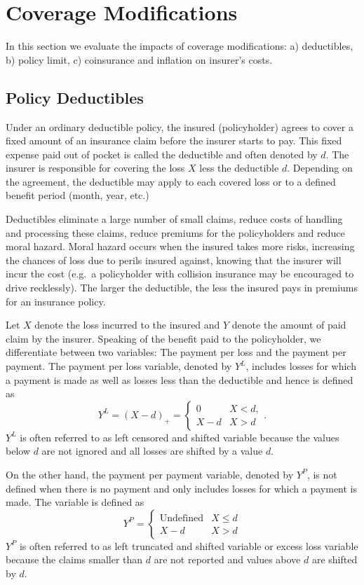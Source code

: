 \documentclass[]{book}
\begin{document}
\section{Coverage Modifications}\label{coverage-modifications}

In this section we evaluate the impacts of coverage modifications: a)
deductibles, b) policy limit, c) coinsurance and inflation on insurer's
costs.

\subsection{Policy Deductibles}\label{PolicyDeduct}

Under an ordinary deductible policy, the insured (policyholder) agrees
to cover a fixed amount of an insurance claim before the insurer starts
to pay. This fixed expense paid out of pocket is called the deductible
and often denoted by \(d\). The insurer is responsible for covering the
loss \(X\) less the deductible \(d\). Depending on the agreement, the
deductible may apply to each covered loss or to a defined benefit period
(month, year, etc.)

Deductibles eliminate a large number of small claims, reduce costs of
handling and processing these claims, reduce premiums for the
policyholders and reduce moral hazard. Moral hazard occurs when the
insured takes more risks, increasing the chances of loss due to perils
insured against, knowing that the insurer will incur the cost (e.g.~a
policyholder with collision insurance may be encouraged to drive
recklessly). The larger the deductible, the less the insured pays in
premiums for an insurance policy.

Let \(X\) denote the loss incurred to the insured and \(Y\) denote the
amount of paid claim by the insurer. Speaking of the benefit paid to the
policyholder, we differentiate between two variables: The payment per
loss and the payment per payment. The payment per loss variable, denoted
by \(Y^{L}\), includes losses for which a payment is made as well as
losses less than the deductible and hence is defined as
\[Y^{L} = \left( X - d \right)_{+} 
= \left\{ \begin{array}{cc}
0 & X < d, \\
X - d & X > d  
\end{array} \right. .\] \(Y^{L}\) is often referred to as left censored
and shifted variable because the values below \(d\) are not ignored and
all losses are shifted by a value \(d\).

On the other hand, the payment per payment variable, denoted by
\(Y^{P}\), is not defined when there is no payment and only includes
losses for which a payment is made. The variable is defined as
\[Y^{P} = \left\{ \begin{matrix}
\text{Undefined} & X \le d \\
X - d & X > d 
\end{matrix} \right. \] \(Y^{P}\) is often referred to as left truncated
and shifted variable or excess loss variable because the claims smaller
than \(d\) are not reported and values above \(d\) are shifted by \(d\).
\end{document}
